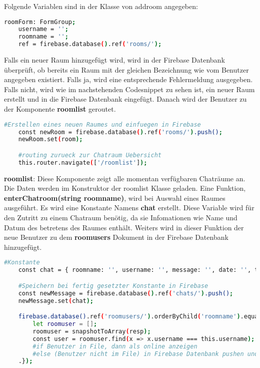 Folgende Variablen sind in der Klasse von addroom angegeben:

\begin{lstlisting}[language=bash]
    roomForm: FormGroup;
    username = '';
    roomname = '';
    ref = firebase.database().ref('rooms/');
\end{lstlisting}

Falls ein neuer Raum hinzugefügt wird, wird in der Firebase Datenbank überprüft, ob bereits ein Raum mit der gleichen Bezeichnung wie vom Benutzer angegeben existiert. Falls ja, wird eine entsprechende Fehlermeldung ausgegeben. Falls
nicht, wird wie im nachstehenden Codesnippet zu sehen ist, ein neuer Raum erstellt und in die Firebase Datenbank eingefügt. Danach wird der Benutzer zu der Komponente \textbf{roomlist} geroutet.

\begin{lstlisting}[language=bash]
    #Erstellen eines neuen Raumes und einfuegen in Firebase
    const newRoom = firebase.database().ref('rooms/').push();
    newRoom.set(room);

    #routing zurueck zur Chatraum Uebersicht
    this.router.navigate(['/roomlist']);
\end{lstlisting}

\textbf{roomlist}: Diese Komponente zeigt alle momentan verfügbaren Chaträume an. Die Daten werden im Konstruktor der roomlist Klasse geladen.\newline
Eine Funktion, \textbf{enterChatroom(string roomname)}, wird bei Auswahl eines Raumes ausgeführt. Es wird eine Konstante Namens \textbf{chat} erstellt. Diese Variable wird für den Zutritt zu einem Chatraum benötig, da sie 
Infomationen wie Name und Datum des betretens des Raumes enthält. Weiters wird in dieser Funktion der neue Benutzer zu dem \textbf{roomusers} Dokument in der Firebase Datenbank hinzugefügt.

\begin{lstlisting}[language=bash]
    #Konstante
    const chat = { roomname: '', username: '', message: '', date: '', type: '' };

    #Speichern bei fertig gesetzter Konstante in Firebase
    const newMessage = firebase.database().ref('chats/').push();
    newMessage.set(chat);

    firebase.database().ref('roomusers/').orderByChild('roomname').equalTo(roomname).on('value', (resp: any) => {
        let roomuser = [];
        roomuser = snapshotToArray(resp);
        const user = roomuser.find(x => x.username === this.username);
        #if Benutzer in File, dann als online anzeigen
        #else (Benutzer nicht im File) in Firebase Datenbank pushen und als online anzeigen
    .});
\end{lstlisting}

